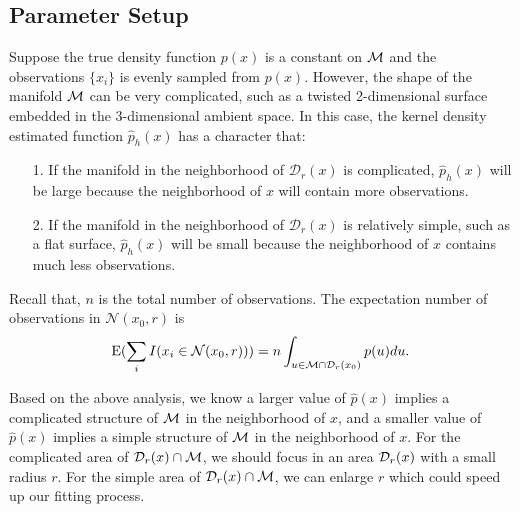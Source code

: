 \documentclass[aos,preprint]{imsart}
\theoremstyle{remark}
\begin{document}
\subsection{Parameter Setup}
Suppose the true density function $p(x)$ is a constant on $\cal M$ and the observations $\{x_i\}$ is evenly sampled from $p(x)$.  However, the shape of the manifold $\cal M$ can be very complicated, such as a twisted 2-dimensional surface embedded in the 3-dimensional ambient space. In this case, the kernel density estimated function $\hat{p}_h(x)$ has a character that:
\begin{itemize}
\item[1.] If the manifold in the neighborhood of ${\mathcal D}_r(x)$ is complicated, $\hat{p}_h(x)$ will be large because the neighborhood of $x$ will contain more observations.
\item[2.] If the manifold in the neighborhood of ${\mathcal D}_r(x)$ is relatively simple, such as a flat surface, $\hat{p}_h(x)$ will be small because the neighborhood of $x$ contains much less observations.
\end{itemize}
Recall that, $n$ is the total number of observations. The expectation number of observations in ${\mathcal N}(x_0 ,r)$ is 
\[
{\rm E}(\sum_i I(x_i\in {\mathcal N}(x_0 ,r)))=n \int_{u\in {\cal M}\cap{\mathcal D}_r(x_0) } p(u) du.
\]

Based on the above analysis, we know a larger value of $\hat{p}(x)$ implies a complicated structure of $\cal M$ in the neighborhood of $x$, and a smaller value of $\hat{p}(x)$ implies a simple structure of $\cal M$ in the neighborhood of $x$.
For the complicated area of ${\cal D}_r(x) \cap\cal M$, we should focus in an area ${\cal D}_r(x)$ with a small radius $r$. For the simple area of ${\cal D}_r(x) \cap\cal M$, we can enlarge $r$ which could speed up our fitting process.
%
%
\end{document}
